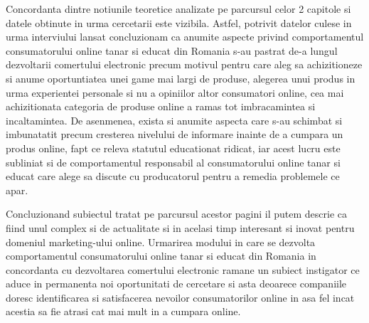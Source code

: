 \documentclass[a4paper, 12pt]{article}
\begin{document}
	\quad Concordanta dintre notiunile teoretice analizate pe parcursul celor 2 capitole si datele obtinute in urma cercetarii este vizibila. Astfel, potrivit datelor culese in urma interviului lansat concluzionam ca anumite aspecte privind comportamentul consumatorului online tanar si educat din Romania s-au pastrat de-a lungul dezvoltarii comertului electronic precum motivul pentru care aleg sa achizitioneze si anume oportuntiatea unei game mai largi de produse, alegerea unui produs in urma experientei personale si nu a opiniilor altor consumatori online, cea mai achizitionata categoria de produse online a ramas tot imbracamintea si incaltamintea. De asenmenea, exista si anumite aspecta care s-au schimbat si imbunatatit precum cresterea nivelului de informare inainte de a cumpara un produs online, fapt ce releva statutul educationat ridicat, iar acest lucru este subliniat si de comportamentul responsabil al consumatorului online tanar si educat care alege sa discute cu producatorul pentru a remedia problemele ce apar.
	
	\quad Concluzionand subiectul tratat pe parcursul acestor pagini il putem descrie ca fiind unul complex si de actualitate si in acelasi timp interesant si inovat pentru domeniul marketing-ului online. Urmarirea modului in care se dezvolta comportamentul consumatorului online tanar si educat din Romania in concordanta cu dezvoltarea comertului electronic ramane un subiect instigator ce aduce in permanenta noi oportunitati de cercetare si asta deoarece companiile doresc identificarea si satisfacerea nevoilor consumatorilor online in asa fel incat acestia sa fie atrasi cat mai mult in a cumpara online.
	\newpage
	
	
\newpage 



\newpage 
\end{document}
